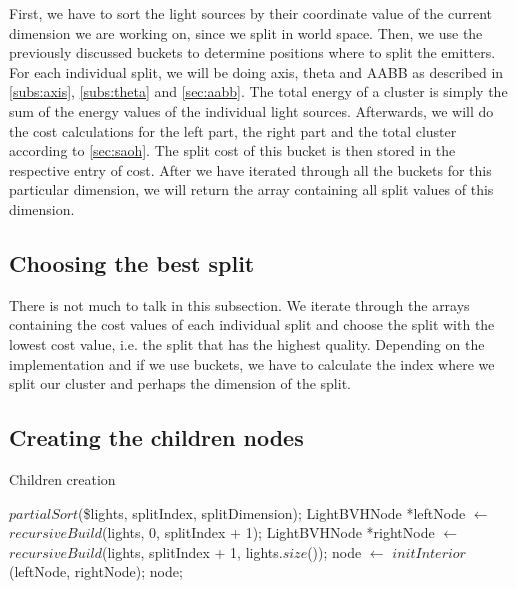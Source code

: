 First, we have to sort the light sources by their coordinate value of the current dimension we are working on, since we split in world space. Then, we use the previously discussed buckets to determine positions where to split the emitters. For each individual split, we will be doing axis, theta and AABB as described in \ref{subs:axis}, \ref{subs:theta} and \ref{sec:aabb}. The total energy of a cluster is simply the sum of the energy values of the individual light sources. Afterwards, we will do the cost calculations for the left part, the right part and the total cluster according to \ref{sec:saoh}. The split cost of this bucket is then stored in the respective entry of cost. After we have iterated through all the buckets for this particular dimension, we will return the array containing all split values of this dimension.

\subsection{Choosing the best split}

There is not much to talk in this subsection. We iterate through the arrays containing the cost values of each individual split and choose the split with the lowest cost value, i.e. the split that has the highest quality. Depending on the implementation and if we use buckets, we have to calculate the index where we split our cluster and perhaps the dimension of the split.

\subsection{Creating the children nodes}

\begin{algorithm}
	\caption{Children creation}
	\label{alg:childrencreation}
	\begin{algorithmic}[1] %
		\State $partialSort$(\$lights, splitIndex, splitDimension);
		\State LightBVHNode *leftNode $\gets$ $recursiveBuild$(lights, 0, splitIndex + 1);
		\State LightBVHNode *rightNode $\gets$ $recursiveBuild$(lights, splitIndex + 1, lights.$size$());
		\State node $\gets$ $initInterior$(leftNode, rightNode);
		\State \Return node;
		\EndProcedure
	\end{algorithmic}
\end{algorithm}

